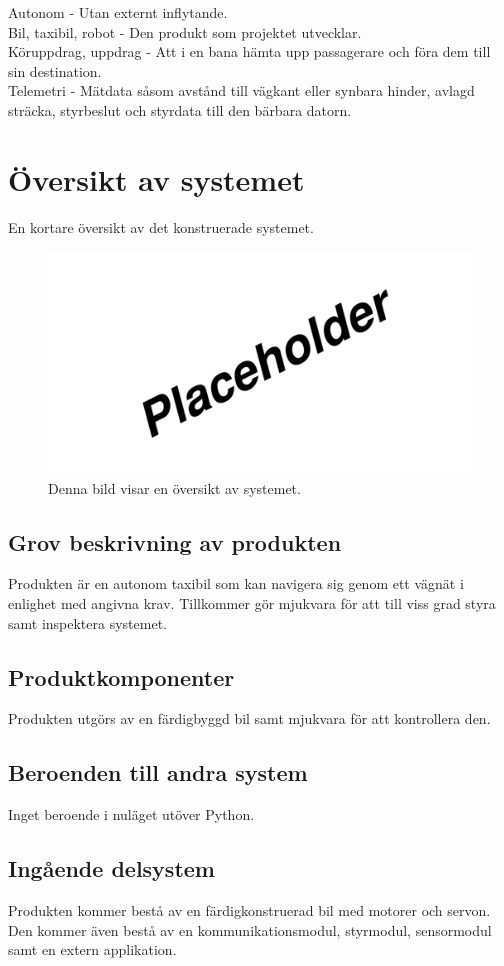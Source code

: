 \documentclass[10pt,oneside,swedish]{../lips}
\begin{document}
Autonom - Utan externt inflytande.\\
Bil, taxibil, robot - Den produkt som projektet utvecklar.\\
Köruppdrag, uppdrag - Att i en bana hämta upp passagerare och föra dem till sin destination.\\
Telemetri - Mätdata såsom avstånd till vägkant eller synbara hinder, avlagd sträcka, styrbeslut och styrdata till den bärbara datorn.\\


\section{Översikt av systemet}
En kortare översikt av det konstruerade systemet.
\begin{figure}[htbp]
  \centering
  \includegraphics[width=.7\textwidth]{../Figures/placeholder}
  \caption{Denna bild visar en översikt av systemet.}
  \label{fig:oversikt}
\end{figure}

\subsection{Grov beskrivning av produkten}
Produkten är en autonom taxibil som kan navigera sig genom ett vägnät i enlighet med angivna krav. Tillkommer gör mjukvara för att till viss grad styra samt inspektera systemet.

\subsection{Produktkomponenter}
Produkten utgörs av en färdigbyggd bil samt mjukvara för att kontrollera den. 

\subsection{Beroenden till andra system}
Inget beroende i nuläget utöver Python.

\subsection{Ingående delsystem}
Produkten kommer bestå av en färdigkonstruerad bil med motorer och servon. 
Den kommer även bestå av en kommunikationsmodul, styrmodul, sensormodul samt en extern applikation.
\end{document}
